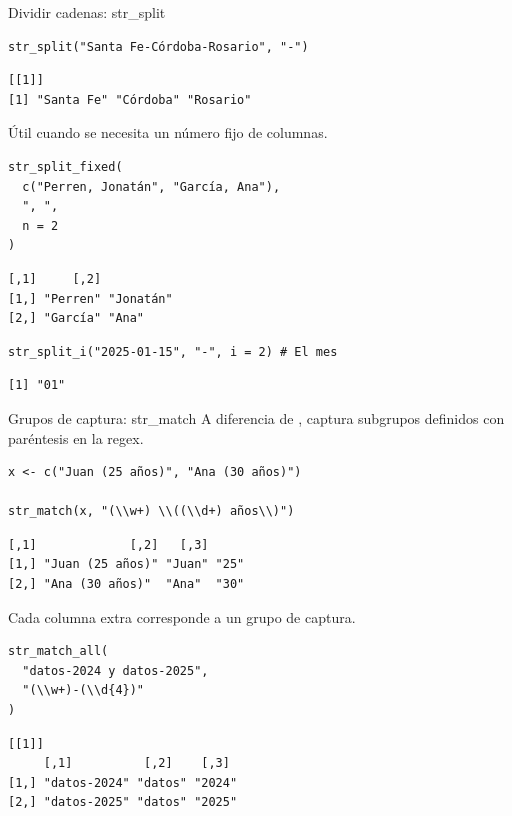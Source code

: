 \documentclass[8pt]{beamer}
\begin{document}
\begin{frame}[fragile]{Dividir cadenas: str\_split}
\begin{lstlisting}[style=RScript]
str_split("Santa Fe-Córdoba-Rosario", "-")
\end{lstlisting}
\begin{lstlisting}[style=RConsole]
[[1]]
[1] "Santa Fe" "Córdoba" "Rosario"
\end{lstlisting}

	Útil cuando se necesita un número fijo de columnas.
\begin{lstlisting}[style=RScript]
str_split_fixed(
  c("Perren, Jonatán", "García, Ana"),
  ", ",
  n = 2
)
\end{lstlisting}
\begin{lstlisting}[style=RConsole]
     [,1]     [,2]
[1,] "Perren" "Jonatán"
[2,] "García" "Ana"
\end{lstlisting}

\begin{lstlisting}[style=RScript]
str_split_i("2025-01-15", "-", i = 2) # El mes
\end{lstlisting}
\begin{lstlisting}[style=RConsole]
[1] "01"
\end{lstlisting}
\end{frame}



\begin{frame}[fragile]{Grupos de captura: str\_match}
	A diferencia de ,  captura subgrupos definidos con paréntesis en la regex.

\begin{lstlisting}[style=RScript]
x <- c("Juan (25 años)", "Ana (30 años)")

str_match(x, "(\\w+) \\((\\d+) años\\)")
\end{lstlisting}
\begin{lstlisting}[style=RConsole]
     [,1]             [,2]   [,3]
[1,] "Juan (25 años)" "Juan" "25"
[2,] "Ana (30 años)"  "Ana"  "30"
\end{lstlisting}

	Cada columna extra corresponde a un grupo de captura.

\begin{lstlisting}[style=RScript]
str_match_all(
  "datos-2024 y datos-2025",
  "(\\w+)-(\\d{4})"
)
\end{lstlisting}
\begin{lstlisting}[style=RConsole]
[[1]]
     [,1]          [,2]    [,3]
[1,] "datos-2024" "datos" "2024"
[2,] "datos-2025" "datos" "2025"
\end{lstlisting}
\end{frame}
\end{document}
